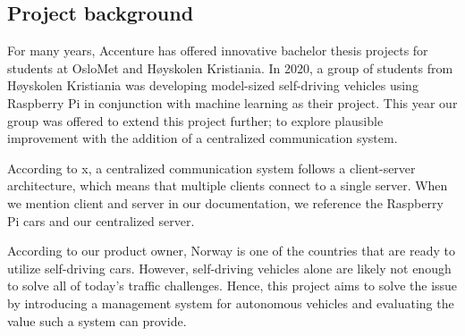 \subsection{Project background}
For many years, Accenture has offered innovative bachelor thesis projects for students at OsloMet and Høyskolen Kristiania. In 2020, a group of students from Høyskolen Kristiania was developing model-sized self-driving vehicles using Raspberry Pi in conjunction with machine learning as their project. This year our group was offered to extend this project further; to explore plausible improvement with the addition of a centralized communication system.

According to x, a centralized communication system follows a client-server architecture, which means that multiple clients connect to a single server. When we mention client and server in our documentation, we reference the Raspberry Pi cars and our centralized server.

According to our product owner, Norway is one of the countries that are ready to utilize self-driving cars. However, self-driving vehicles alone are likely not enough to solve all of today's traffic challenges. Hence, this project aims to solve the issue by introducing a management system for autonomous vehicles and evaluating the value such a system can provide.